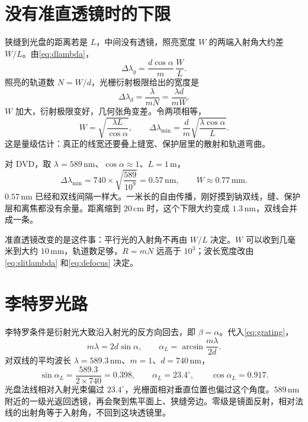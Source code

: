 \documentclass[a4paper,11pt]{ctexart}
\begin{document}
\section{没有准直透镜时的下限}
\label{sec:nolens}

狭缝到光盘的距离若是 \(L\)，中间没有透镜，照亮宽度 \(W\) 的两端入射角大约差 \(W/L\)。由\eqref{eq:dlambda}，
\begin{equation}
\Delta\lambda_g = \frac{d\cos\alpha}{m}\,\frac{W}{L}.
\end{equation}
照亮的轨道数 \(N=W/d\)，光栅衍射极限给出的宽度是
\begin{equation}
\Delta\lambda_d = \frac{\lambda}{m N} = \frac{\lambda d}{m W}.
\end{equation}
\(W\) 加大，衍射极限变好，几何张角变差。令两项相等，
\begin{equation}
\label{eq:wopt}
W = \sqrt{\frac{\lambda L}{\cos\alpha}},
\qquad
\Delta\lambda_{\min}
= \frac{d}{m}\sqrt{\frac{\lambda\cos\alpha}{L}}.
\end{equation}
这是量级估计：真正的线宽还要叠上缝宽、保护层里的散射和轨道弯曲。

对 DVD，取 \(\lambda=589\,\mathrm{nm}\)、\(\cos\alpha\approx 1\)、\(L=1\,\mathrm{m}\)，
\[
\Delta\lambda_{\min}
= 740\times\sqrt{\frac{589}{10^{9}}}
= 0.57\,\mathrm{nm},
\qquad
W\approx 0.77\,\mathrm{mm}.
\]
\(0.57\,\mathrm{nm}\) 已经和双线间隔一样大。一米长的自由传播，刚好摸到钠双线，缝、保护层和离焦都没有余量。距离缩到 \(20\,\mathrm{cm}\) 时，这个下限大约变成 \(1.3\,\mathrm{nm}\)，双线会并成一条。

准直透镜改变的是这件事：平行光的入射角不再由 \(W/L\) 决定。\(W\) 可以收到几毫米到大约 \(10\,\mathrm{mm}\)，轨道数足够，\(R=mN\) 远高于 \(10^3\)；波长宽度改由\eqref{eq:slitlambda} 和\eqref{eq:defocus} 决定。

\section{李特罗光路}
\label{sec:littrow}

李特罗条件是衍射光大致沿入射光的反方向回去，即 \(\beta=\alpha\)。代入\eqref{eq:grating}，
\begin{equation}
\label{eq:littrow}
m\lambda = 2d\sin\alpha,
\qquad
\alpha_L = \arcsin\frac{m\lambda}{2d}.
\end{equation}
对双线的平均波长 \(\lambda=589.3\,\mathrm{nm}\)、\(m=1\)、\(d=740\,\mathrm{nm}\)，
\begin{equation}
\sin\alpha_L = \frac{589.3}{2\times 740} = 0.398,
\qquad
\alpha_L = 23.4^\circ,
\qquad
\cos\alpha_L = 0.917.
\end{equation}
光盘法线相对入射光束偏过 \(23.4^\circ\)，光栅面相对垂直位置也偏过这个角度。\(589\,\mathrm{nm}\) 附近的一级光返回透镜，再会聚到焦平面上、狭缝旁边。零级是镜面反射，相对法线的出射角等于入射角，不回到这块透镜里。
\end{document}
